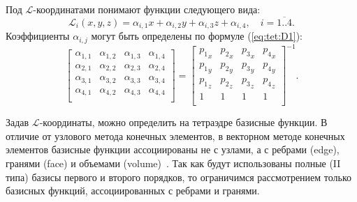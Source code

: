 \documentclass[a4paper,12pt]{article}
\begin{document}
\noindent Под $\mathcal{L}$-координатами понимают функции следующего вида:
\begin{equation*}
	\mathcal{L}_i (x, y, z) = \alpha_{i, 1} x + \alpha_{i, 2} y + \alpha_{i, 3} z + \alpha_{i, 4} , \text{~~~} i = \overline{1..4} . \label{eq:tet:L}
\end{equation*}
Коэффициенты $\alpha_{i, j}$ могут быть определены по формуле (\ref{eq:tet:D1}):
\begin{equation}
	\left[
	\begin{matrix}
		\alpha_{1, 1} & \alpha_{1, 2} & \alpha_{1, 3} & \alpha_{1, 4} \\
		\alpha_{2, 1} & \alpha_{2, 2} & \alpha_{2, 3} & \alpha_{2, 4} \\
		\alpha_{3, 1} & \alpha_{3, 2} & \alpha_{3, 3} & \alpha_{3, 4} \\
		\alpha_{4, 1} & \alpha_{4, 2} & \alpha_{4, 3} & \alpha_{4, 4} \\
	\end{matrix}
	\right] = \left[
	\begin{matrix}
		{p_1}_x & {p_2}_x & {p_3}_x & {p_4}_x \\
		{p_1}_y & {p_2}_y & {p_3}_y & {p_4}_y \\
		{p_1}_z & {p_2}_z & {p_3}_z & {p_4}_z \\
		1 & 1 & 1 & 1 \\
	\end{matrix}
	\right]^{-1} . \label{eq:tet:D1}
\end{equation}

Задав $\mathcal{L}$-координаты, можно определить на тетраэдре базисные функции. В отличие от узлового метода конечных элементов, в векторном методе конечных элементов базисные функции ассоциированы не с узлами, а с ребрами (edge), гранями (face) и объемами (volume)~\citep{nechaev, webb1999}. Так как будут использованы полные (II типа) базисы первого и второго порядков, то ограничимся рассмотрением только базисных функций, ассоциированных с ребрами и гранями.
\end{document}
